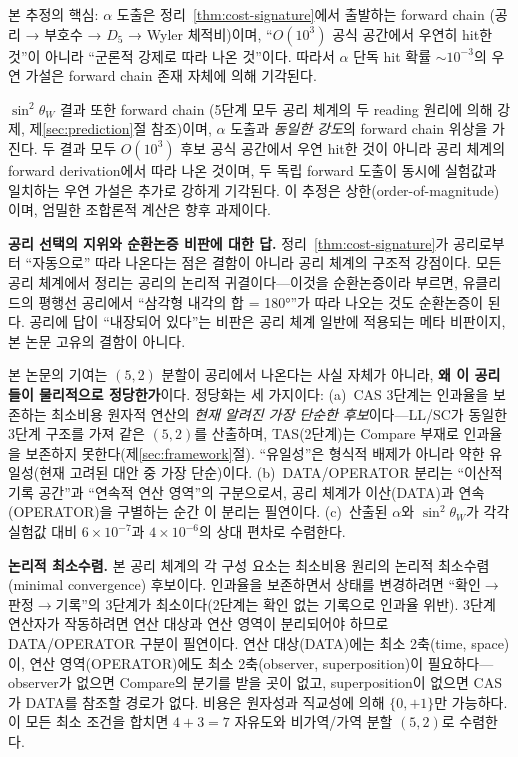 \documentclass[entropy,article,submit,pdftex,oneauthor]{Definitions/mdpi}
\begin{document}
본 추정의 핵심: $\alpha$ 도출은 정리~\ref{thm:cost-signature}에서 출발하는 forward chain (공리 → 부호수 → $D_5$ → Wyler 체적비)이며, ``$O(10^3)$ 공식 공간에서 우연히 hit한 것''이 아니라 ``군론적 강제로 따라 나온 것''이다. 따라서 $\alpha$ 단독 hit 확률 $\sim 10^{-3}$의 우연 가설은 forward chain 존재 자체에 의해 기각된다.

$\sin^2\theta_W$ 결과 또한 forward chain (5단계 모두 공리 체계의 두 reading 원리에 의해 강제, 제\ref{sec:prediction}절 참조)이며, $\alpha$ 도출과 \emph{동일한 강도}의 forward chain 위상을 가진다. 두 결과 모두 $O(10^3)$ 후보 공식 공간에서 우연 hit한 것이 아니라 공리 체계의 forward derivation에서 따라 나온 것이며, 두 독립 forward 도출이 동시에 실험값과 일치하는 우연 가설은 추가로 강하게 기각된다. 이 추정은 상한(order-of-magnitude)이며, 엄밀한 조합론적 계산은 향후 과제이다.

\textbf{공리 선택의 지위와 순환논증 비판에 대한 답.} 정리~\ref{thm:cost-signature}가 공리로부터 ``자동으로'' 따라 나온다는 점은 결함이 아니라 공리 체계의 구조적 강점이다. 모든 공리 체계에서 정리는 공리의 논리적 귀결이다---이것을 순환논증이라 부르면, 유클리드의 평행선 공리에서 ``삼각형 내각의 합 = 180°''가 따라 나오는 것도 순환논증이 된다. 공리에 답이 ``내장되어 있다''는 비판은 공리 체계 일반에 적용되는 메타 비판이지, 본 논문 고유의 결함이 아니다.

본 논문의 기여는 $(5,2)$ 분할이 공리에서 나온다는 사실 자체가 아니라, \textbf{왜 이 공리들이 물리적으로 정당한가}이다. 정당화는 세 가지이다: (a)~CAS 3단계는 인과율을 보존하는 최소비용 원자적 연산의 \emph{현재 알려진 가장 단순한 후보}이다---LL/SC가 동일한 3단계 구조를 가져 같은 $(5,2)$를 산출하며, TAS(2단계)는 Compare 부재로 인과율을 보존하지 못한다(제\ref{sec:framework}절). ``유일성''은 형식적 배제가 아니라 약한 유일성(현재 고려된 대안 중 가장 단순)이다. (b)~DATA/OPERATOR 분리는 ``이산적 기록 공간''과 ``연속적 연산 영역''의 구분으로서, 공리 체계가 이산(DATA)과 연속(OPERATOR)을 구별하는 순간 이 분리는 필연이다. (c)~산출된 $\alpha$와 $\sin^2\theta_W$가 각각 실험값 대비 $6 \times 10^{-7}$과 $4 \times 10^{-6}$의 상대 편차로 수렴한다.

\textbf{논리적 최소수렴.} 본 공리 체계의 각 구성 요소는 최소비용 원리의 논리적 최소수렴(minimal convergence) 후보이다. 인과율을 보존하면서 상태를 변경하려면 ``확인$\to$판정$\to$기록''의 3단계가 최소이다(2단계는 확인 없는 기록으로 인과율 위반). 3단계 연산자가 작동하려면 연산 대상과 연산 영역이 분리되어야 하므로 DATA/OPERATOR 구분이 필연이다. 연산 대상(DATA)에는 최소 2축(time, space)이, 연산 영역(OPERATOR)에도 최소 2축(observer, superposition)이 필요하다---observer가 없으면 Compare의 분기를 받을 곳이 없고, superposition이 없으면 CAS가 DATA를 참조할 경로가 없다. 비용은 원자성과 직교성에 의해 $\{0, +1\}$만 가능하다. 이 모든 최소 조건을 합치면 $4 + 3 = 7$ 자유도와 비가역/가역 분할 $(5,2)$로 수렴한다.
\end{document}
